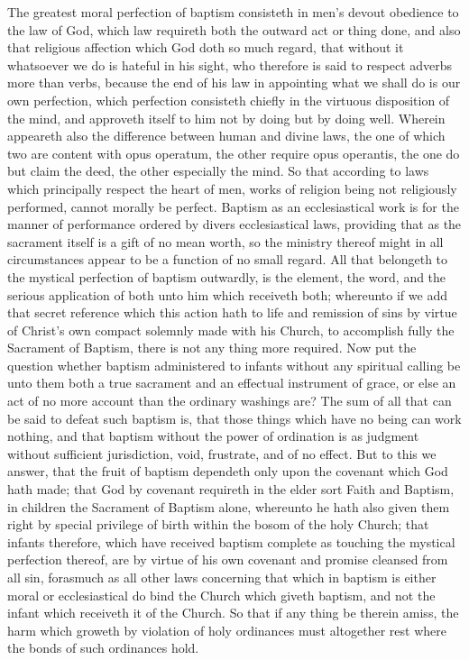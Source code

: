 The greatest moral perfection of baptism consisteth in men’s devout obedience to the law of God, which law requireth both the outward act or thing done, and also that religious affection which God doth so much regard, that without it whatsoever we do is hateful in his sight, who therefore is said to respect adverbs more than verbs, because the end of his  law in appointing what we shall do is our own perfection, which perfection consisteth chiefly in the virtuous disposition of the mind, and approveth itself to him not by doing but by doing well. Wherein appeareth also the difference between human and divine laws, the one of which two are content with opus operatum, the other require opus operantis, the one do but claim the deed, the other especially the mind. So that according to laws which principally respect the heart of men, works of religion being not religiously performed, cannot morally be perfect.
Baptism as an ecclesiastical work is for the manner of performance ordered by divers ecclesiastical laws, providing that as the sacrament itself is a gift of no mean worth, so the ministry thereof might in all circumstances appear to be a function of no small regard.
All that belongeth to the mystical perfection of baptism outwardly, is the element, the word, and the serious application of both unto him which receiveth both; whereunto if we add that secret reference which this action hath to life and remission of sins by virtue of Christ’s own compact solemnly made with his Church, to accomplish fully the Sacrament of Baptism, there is not any thing more required.
Now put the question whether baptism administered to infants without any spiritual calling be unto them both a true sacrament and an effectual instrument of grace, or else an act of no more account than the ordinary washings are? The sum of all that can be said to defeat such baptism is, that those things which have no being can work nothing, and that baptism without the power of ordination is as judgment without sufficient jurisdiction, void, frustrate, and of no effect. But to this we answer, that the fruit of baptism dependeth  only upon the covenant which God hath made; that God by covenant requireth in the elder sort Faith and Baptism, in children the Sacrament of Baptism alone, whereunto he hath also given them right by special privilege of birth within the bosom of the holy Church; that infants therefore, which have received baptism complete as touching the mystical perfection thereof, are by virtue of his own covenant and promise cleansed from all sin, forasmuch as all other laws concerning that which in baptism is either moral or ecclesiastical do bind the Church which giveth baptism, and not the infant which receiveth it of the Church. So that if any thing be therein amiss, the harm which groweth by violation of holy ordinances must altogether rest where the bonds of such ordinances hold.
